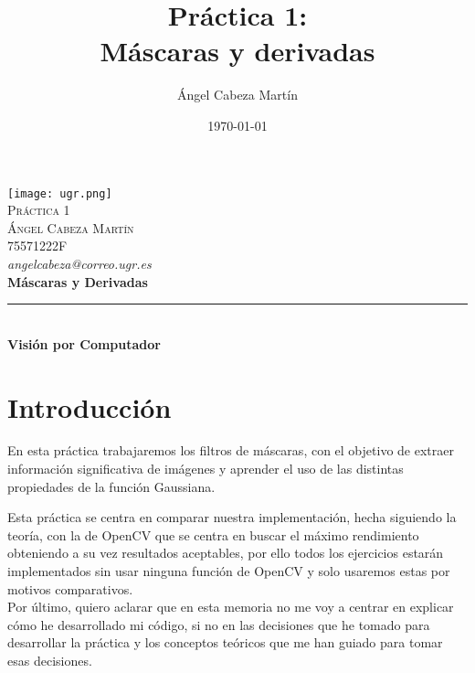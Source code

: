 \documentclass[12pt,spanish]{article}
\title{Práctica 1:\\
Máscaras y derivadas  \hspace{0.05cm} }
\author{Ángel Cabeza Martín}
\date{\today}
\begin{document}
\begin{titlepage}
 
 
\newlength{\centeroffset}
\setlength{\centeroffset}{-0.5\oddsidemargin}
\addtolength{\centeroffset}{0.5\evensidemargin}
\thispagestyle{empty}

\noindent\hspace*{\centeroffset}

\centering
\texttt{[image: ugr.png]}\\[0.5cm]

\textsc{ \Large Práctica 1\\[0.2cm]}
\textsc{ \Large Ángel Cabeza Martín}\\
\textsc{ \Large 75571222F}\\
\textsl{ angelcabeza@correo.ugr.es}\\[0.5cm]
% 
{\Huge\bfseries Máscaras y Derivadas\\
}
\noindent\rule[-1ex]{\textwidth}{2pt}\\[3.5ex]
{\large\bfseries Visión por Computador}
\end{titlepage}


\tableofcontents
\pagebreak

\section*{Introducción}
En esta práctica trabajaremos los filtros de máscaras, con el objetivo de extraer información significativa de imágenes y aprender el uso de las distintas propiedades de la función Gaussiana.\newline 

Esta práctica se centra en comparar nuestra implementación, hecha siguiendo la teoría, con la de OpenCV que se centra en buscar el máximo rendimiento obteniendo a su vez resultados aceptables, por ello todos los ejercicios estarán implementados sin usar ninguna función de OpenCV y solo usaremos estas por motivos comparativos.\\


Por último, quiero aclarar que en esta memoria no me voy a centrar en explicar cómo he desarrollado mi código, si no en las decisiones que he tomado para desarrollar la práctica y los conceptos teóricos que me han guiado para tomar esas decisiones.
\end{document}
